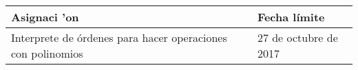\documentclass{article}
\begin{document}
\begin{center}
\begin{tabular}{|p{2.0in}|p{2.0in}|}
\hline
{\bf Asignaci 'on} & {\bf Fecha l\'imite}		\\ \hline
Interprete de \'ordenes para hacer operaciones		     con polinomios &
27 de octubre de 2017\\ \hline
\end{tabular}
\end{center}
\end{document}
